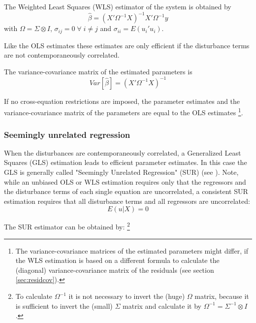 \documentclass[article]{jss}
\begin{document}
The Weighted Least Squares (WLS) estimator of the system 
is obtained by
\begin{equation}
   \widehat{\beta} = \left( X' \Omega^{-1} X \right)^{-1} X' \Omega^{-1} y
\end{equation}
with $\Omega = \Sigma \otimes I$, 
$\sigma_{ij} = 0 \; \forall \; i \neq j$ and
$\sigma_{ii} = E \left( u_i' u_i \right)$.

Like the OLS estimates these estimates are only efficient 
if the disturbance terms are not contemporaneously correlated.

The variance-covariance matrix of the estimated parameters is
\begin{equation}
   Var \left[ \widehat{\beta} \right] = \left( X' \Omega^{-1} X \right)^{-1}
\end{equation}

If no cross-equation restrictions are imposed, 
the parameter estimates and the variance-covariance matrix 
of the parameters are equal to the OLS estimates%
\footnote{The variance-covariance matrices of the 
estimated parameters might differ, 
if the WLS estimation is based on a different formula 
to calculate the (diagonal) variance-covariance 
matrix of the residuals (see section \ref{sec:residcov}).}.  

\subsubsection{Seemingly unrelated regression}

When the disturbances are contemporaneously correlated, a Generalized 
Least Squares (GLS) estimation leads to efficient parameter estimates.
In this case the GLS is generally called "Seemingly Unrelated Regression" 
(SUR) (see \citealp{zellner62}). 
Note, while an unbiased OLS or WLS estimation requires only that 
the regressors and the disturbance terms of each single 
equation are uncorrelated,
a consistent SUR estimation requires that all disturbance terms and all 
regressors are uncorrelated:
\begin{equation}
   E \left( u | X \right) = 0
\end{equation}

The SUR estimator can be obtained by:%
\footnote{To calculate $\Omega^{-1}$ it is not necessary to invert 
the (huge) $\Omega$ matrix, 
because it is sufficient to invert the (small) $\Sigma$ matrix and
calculate it by $\Omega^{-1} = \Sigma^{-1} \otimes I$.}
\end{document}
